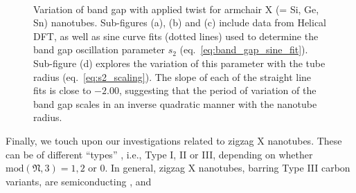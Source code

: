 \documentclass[preprint,12pt, 3p, sort&compress]{elsarticle}
\begin{document}
\begin{figure}[!ht]
\centering
{}\quad
{}\\
\quad
{}
\caption{Variation of band gap with applied twist for armchair X (= Si, Ge, Sn) nanotubes. Sub-figures (a), (b) and (c) include data from Helical DFT, as well as sine curve fits (dotted lines) used to determine the band gap oscillation parameter $s_2$ (eq.~\ref{eq:band_gap_sine_fit}). Sub-figure (d) explores the variation of this parameter with the tube radius (eq.~\ref{eq:s2_scaling}). The slope of each of the straight line fits is close to $-2.00$, suggesting that the period of variation of the band gap scales in an inverse quadratic manner with the nanotube radius.}
\label{fig:s2_plots}
\end{figure}
Finally, we touch upon our investigations related to zigzag X nanotubes. These can be of different ``types'' \citep{ghosh2019symmetry, ding2002analytical}, i.e.,  Type I, II or III, depending on whether $\text{mod}(\mathfrak{N},3) = 1, 2$ or $0$. In general, zigzag X nanotubes, barring Type III carbon variants, are semiconducting \citep{ghosh2019symmetry, ouyang2002fundamental}, and 
\end{document}
